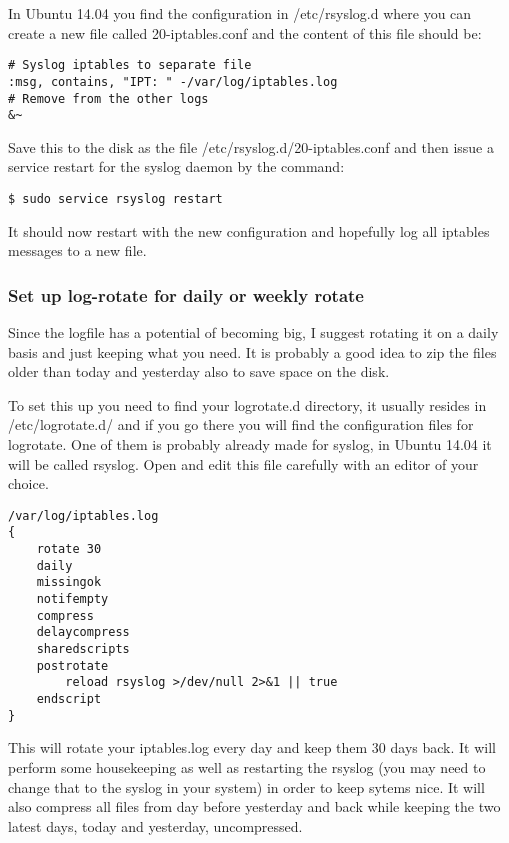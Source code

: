 \documentclass[english,twoside,openright,a4paper,12pt]{article}
\begin{document}
In Ubuntu 14.04 you find the configuration in /etc/rsyslog.d where 
you can create a new file called 20-iptables.conf and the content of 
this file should be:

\begin{verbatim}
# Syslog iptables to separate file
:msg, contains, "IPT: " -/var/log/iptables.log 
# Remove from the other logs
&~
\end{verbatim}

Save this to the disk as the file /etc/rsyslog.d/20-iptables.conf and then issue a service restart for the syslog 
daemon by the command:

\begin{verbatim}
$ sudo service rsyslog restart
\end{verbatim}

It should now restart with the new configuration and hopefully log all iptables messages to a new file.

\subsubsection{Set up log-rotate for daily or weekly rotate}

Since the logfile has a potential of becoming big, I suggest rotating it on a daily basis and just keeping what you need. It is probably a good idea to zip the files older than today and yesterday also to save space on the disk.

To set this up you need to find your logrotate.d directory, it usually resides in /etc/logrotate.d/ and if you go there you will find the configuration files for logrotate. One of them is probably already made for syslog, in Ubuntu 14.04 it will be called rsyslog. Open and edit this file carefully with an editor of your choice.

\begin{verbatim}
/var/log/iptables.log
{
    rotate 30
    daily 
    missingok 
    notifempty 
    compress 
    delaycompress 
    sharedscripts 
    postrotate 
        reload rsyslog >/dev/null 2>&1 || true 
    endscript
}
\end{verbatim}

This will rotate your iptables.log every day and keep them 30 days back. It will perform some housekeeping as well as restarting the rsyslog (you may need to change that to the syslog in your system) in order to keep sytems nice. It will also compress all files from day before yesterday and back while keeping the two latest days, today and yesterday, uncompressed.
\end{document}
